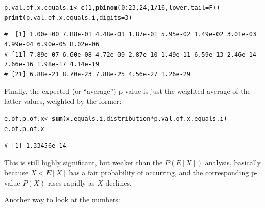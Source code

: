 \documentclass{article}\usepackage[]{graphicx}\usepackage[]{color}
\makeatletter
\newcommand{\hlnum}[1]{\textcolor[rgb]{0.686,0.059,0.569}{#1}}%
\newcommand{\hlopt}[1]{\textcolor[rgb]{0,0,0}{#1}}%
\newcommand{\hlstd}[1]{\textcolor[rgb]{0.345,0.345,0.345}{#1}}%
\newcommand{\hlkwb}[1]{\textcolor[rgb]{0.69,0.353,0.396}{#1}}%
\newcommand{\hlkwc}[1]{\textcolor[rgb]{0.333,0.667,0.333}{#1}}%
\newcommand{\hlkwd}[1]{\textcolor[rgb]{0.737,0.353,0.396}{\textbf{#1}}}%
\newenvironment{kframe}{%
 \def\at@end@of@kframe{}%
 \ifinner\ifhmode%
  \def\at@end@of@kframe{\end{minipage}}%
  \begin{minipage}{\columnwidth}%
 \fi\fi%
 \def\FrameCommand##1{\hskip\@totalleftmargin \hskip-\fboxsep
 \colorbox{shadecolor}{##1}\hskip-\fboxsep
     \hskip-\linewidth \hskip-\@totalleftmargin \hskip\columnwidth}%
 \MakeFramed {\advance\hsize-\width
   \@totalleftmargin\z@ \linewidth\hsize
   \@setminipage}}%
 {\par\unskip\endMakeFramed%
 \at@end@of@kframe}
\newenvironment{knitrout}{}{} %
\makeatother
\begin{document}
\begin{enumerate}
\begin{knitrout}\footnotesize
{}\color{fgcolor}\begin{kframe}
\begin{alltt}
\hlstd{p.val.of.x.equals.i} \hlkwb{<-} \hlkwd{c}\hlstd{(}\hlnum{1}\hlstd{,} \hlkwd{pbinom}\hlstd{(}\hlnum{0}\hlopt{:}\hlnum{23}\hlstd{,} \hlnum{24}\hlstd{,} \hlnum{1}\hlopt{/}\hlnum{16}\hlstd{,} \hlkwc{lower.tail} \hlstd{= F))}
\hlkwd{print}\hlstd{(p.val.of.x.equals.i,} \hlkwc{digits}\hlstd{=}\hlnum{3}\hlstd{)}
\end{alltt}
\begin{verbatim}
#  [1] 1.00e+00 7.88e-01 4.48e-01 1.87e-01 5.95e-02 1.49e-02 3.01e-03 4.99e-04 6.90e-05 8.02e-06
# [11] 7.89e-07 6.60e-08 4.72e-09 2.87e-10 1.49e-11 6.59e-13 2.46e-14 7.66e-16 1.98e-17 4.14e-19
# [21] 6.88e-21 8.70e-23 7.88e-25 4.56e-27 1.26e-29
\end{verbatim}
\end{kframe}
\end{knitrout}

Finally, the expected (or ``average'') p-value is just the weighted average of the latter values, weighted by the former:

\begin{knitrout}\footnotesize
{}\color{fgcolor}\begin{kframe}
\begin{alltt}
\hlstd{e.of.p.of.x} \hlkwb{<-} \hlkwd{sum}\hlstd{(x.equals.i.distribution} \hlopt{*} \hlstd{p.val.of.x.equals.i)}
\hlstd{e.of.p.of.x}
\end{alltt}
\begin{verbatim}
# [1] 1.33456e-14
\end{verbatim}
\end{kframe}
\end{knitrout}

This is still highly significant, but weaker than the $P(E[X])$ analysis, basically because $X<E[X]$ has a fair probability of occurring, and the corresponding p-value $P(X)$ rises rapidly as $X$ declines.

Another way to look at the numbers:


\end{enumerate}
\end{document}

